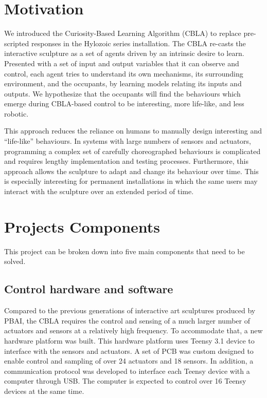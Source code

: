 \section{Motivation}

We introduced the Curiosity-Based Learning Algorithm (CBLA) to replace pre-scripted responses in the Hylozoic series installation.  The CBLA re-casts the interactive sculpture as a set of agents driven by an intrinsic desire to learn.  Presented with a set of input and output variables that it can observe and control, each agent tries to understand its own mechanisms, its surrounding environment, and the occupants, by learning models relating its inputs and outputs. We hypothesize that the occupants will find the behaviours which emerge during CBLA-based control to be interesting, more life-like, and less robotic. 

This approach reduces the reliance on humans to manually design interesting and “life-like” behaviours. In systems with large numbers of sensors and actuators, programming a complex set of carefully choreographed behaviours is complicated and requires lengthy implementation and testing processes. Furthermore, this approach allows the sculpture to adapt and change its behaviour over time. This is especially interesting for permanent installations in which the same users may interact with the sculpture over an extended period of time. 


\section{Projects Components}

This project can be broken down into five main components that need to be solved.

\subsection{Control hardware and software}

Compared to the previous generations of interactive art sculptures produced by PBAI, the CBLA requires the control and sensing of a much larger number of actuators and sensors at a relatively high frequency. To accommodate that, a new hardware platform was built. This hardware platform uses Teensy 3.1 device to interface with the sensors and actuators. A set of PCB was custom designed to enable control and sampling of over 24 actuators and 18 sensors. In addition, a communication protocol was developed to interface each Teensy device with a computer through USB. The computer is expected to control over 16 Teensy devices at the same time.

